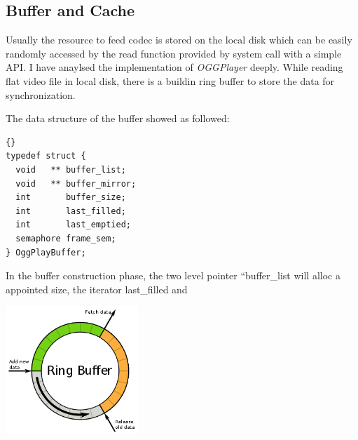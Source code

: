 \subsection{Buffer and Cache}
{
Usually the resource to feed codec is stored on the local disk which can be easily randomly accessed by the read function provided by system call with a simple API.
I have anaylsed the implementation of \emph{OGGPlayer} deeply.
While reading flat video file in local disk, there is a buildin ring buffer to store the data for synchronization.

The data structure of the buffer showed as followed:
\begin{lstlisting}[frame=tb]{}
typedef struct {
  void   ** buffer_list;
  void   ** buffer_mirror;
  int       buffer_size;
  int       last_filled;
  int       last_emptied;
  semaphore frame_sem;
} OggPlayBuffer;
\end{lstlisting}
In the buffer construction phase, the two level pointer ``buffer\_list will alloc a appointed size, the iterator last\_filled and 


\begin{center}
\includegraphics[width=5cm]{data/Ringbuffer.png}
\end{center}  

}

